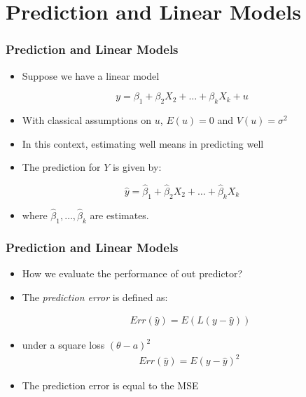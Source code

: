 \documentclass[
  shownotes,
  xcolor={svgnames},
  hyperref={colorlinks,citecolor=DarkBlue,linkcolor=DarkRed,urlcolor=DarkBlue}
  , aspectratio=169]{beamer}
\begin{document}
\section{Prediction and Linear Models}
\begin{frame}
\frametitle{Prediction and Linear Models}

\begin{itemize}
  \item Suppose we have a linear model
\end{itemize}
\bigskip
\begin{equation}\label{eq:3_1_7}
y = \beta_1 +\beta_2 X_2 +\dots+\beta_k X_k +u
\end{equation}

\bigskip
\begin{itemize}
  \item With classical assumptions on $u$, $E(u)=0$ and $V(u) = \sigma^2$
  \item In this context, estimating well means in predicting well 
  \item The prediction for $Y$ is given by:
\end{itemize}

\begin{equation}\label{eq:3_1_8}
\hat{y} = \hat{\beta}_1 + \hat{\beta}_2 X_2 + \dots + \hat{\beta}_k X_k
\end{equation}

\bigskip
\begin{itemize}
  \item where $\hat{\beta}_1,\dots,\hat{\beta}_k$ are estimates. 
\end{itemize}


\end{frame}
\begin{frame}
\frametitle{Prediction and Linear Models}

\begin{itemize}
  \item How we evaluate the performance of out predictor?
  \medskip
  \item The \emph{prediction error} is defined as:


  
  \begin{align}
    Err(\hat y) = E\left(L(y-\hat y)\right)
  \end{align}

  \item under a square loss $(\theta-a)^2$
  \begin{align}
    Err(\hat y) = E\left(y-\hat y\right)^2\
  \end{align}

\medskip
  \item The prediction error is equal to the MSE
  
  
\end{itemize}
\end{frame}
\end{document}
